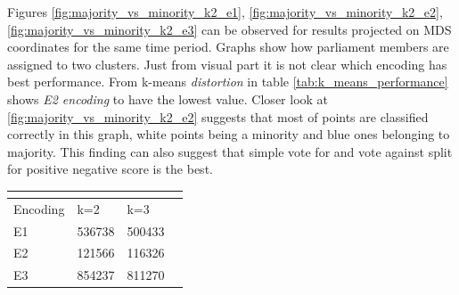 \documentclass[a4paper,12pt]{article}
\begin{document}
	Figures \ref{fig:majority_vs_minority_k2_e1}, \ref{fig:majority_vs_minority_k2_e2}, \ref{fig:majority_vs_minority_k2_e3} can be observed for results projected on MDS coordinates for the same time period. Graphs show how parliament members are assigned to two clusters. Just from visual part it is not clear which encoding has best performance. From \Gls{k-means} \textit{distortion} in table \ref{tab:k_means_performance} shows \textit{E2 encoding} to have the lowest value. Closer look at \ref{fig:majority_vs_minority_k2_e2} suggests that most of points are classified correctly in this graph, white points being a minority and blue ones belonging to majority. This finding can also suggest that simple vote for and vote against split for positive negative score is the best.
	
	
	\noindent
	\begin{center}
		\begin{tabular}{L{3cm} C{2cm} C{2cm} C{2cm}}
			\\ 
			\hline
			Encoding & k=2 & k=3 \\\hline
			E1 & 536738 & 500433 \\
			E2 & 121566 & 116326 \\
			E3 & 854237 & 811270 \\
			\hline
		\end{tabular}
		 \label{tab:k_means_performance}
	\end{center} 
	
\end{document}
